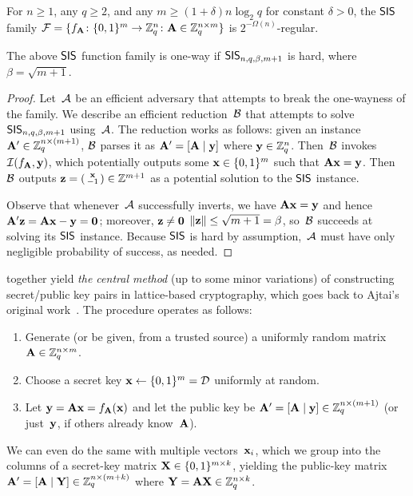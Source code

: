 \documentclass[11pt]{article}
\newcommand{\calI}{\ensuremath{\mathcal{I}}}
\begin{document}
\begin{lemma}%
  \label{lem:sis-regular}
  For $n \geq 1$, any $q \geq 2$, and any
  $m \geq (1+\delta) n \log_{2} q$ for constant $\delta > 0$, the
  $\mathsf{SIS}$ family
  $\mathcal{F}=\{f_{\mathbf{A}} \colon \{0,1\}^{m} \to \mathbb{Z}_q^{n} \colon \mathbf{A} \in
    \mathbb{Z}_q^{n \times m}\}$ is $2^{-\Omega(n)}$-regular.
\end{lemma}

\begin{lemma}%
  \label{lem:sis-oneway}
  The above $\mathsf{SIS}$ function family is one-way if
  $\mathsf{SIS}_{n,q,\beta,m+1}$ is hard, where $\beta=\sqrt{m+1}$.
\end{lemma}

\begin{proof}
  Let~$\mathcal{A}$ be an efficient adversary that attempts to break the
  one-wayness of the family. We describe an efficient
  reduction~$\mathcal{B}$ that attempts to solve~$\mathsf{SIS}_{n,q,\beta,m+1}$
  using~$\mathcal{A}$. The reduction works as follows: given an instance
  $\mathbf{A}' \in \mathbb{Z}_q^{n \times (m+1)}$, $\mathcal{B}$ parses it as
  $\mathbf{A}'=[\mathbf{A} \mid \mathbf{y}]$ where $\mathbf{y} \in \mathbb{Z}_q^{n}$. Then~$\mathcal{B}$
  invokes $\calI(f_{\matA},\vecy)$, which potentially outputs some
  $\mathbf{x} \in \{0,1\}^{m}$ such that $\mathbf{A}\mathbf{x}=\mathbf{y}$. Then~$\mathcal{B}$
  outputs $\mathbf{z} = \left(\begin{smallmatrix}\mathbf{x} \\ -1\end{smallmatrix}\right) \in \mathbb{Z}^{m+1}$ as a potential
  solution to the $\mathsf{SIS}$ instance.

  Observe that whenever~$\mathcal{A}$ successfully inverts, we have
  $\mathbf{A}\mathbf{x}=\mathbf{y}$ and hence
  $\mathbf{A}' \mathbf{z} = \mathbf{A} \mathbf{x} - \mathbf{y} = \mathbf{0}$; moreover,
  $\mathbf{z} \neq \mathbf{0}$ $\lVert\mathbf{z}\rVert \leq \sqrt{m+1}=\beta$,
  so~$\mathcal{B}$ succeeds at solving its $\mathsf{SIS}$ instance. Because $\mathsf{SIS}$
  is hard by assumption,~$\mathcal{A}$ must have only negligible probability
  of success, as needed.
\end{proof}

 together yield \emph{the central
  method} (up to some minor variations) of constructing secret/public
key pairs in lattice-based cryptography, which goes back to Ajtai's
original work~\cite{ajtai04:_gener_hard_instan_lattic_probl}. The
procedure operates as follows:
\begin{enumerate}[itemsep=0pt]
\item Generate (or be given, from a trusted source) a uniformly random
  matrix $\mathbf{A} \in \mathbb{Z}_q^{n \times m}$.
\item Choose a secret key $\mathbf{x} \gets \{0,1\}^{m} = \mathcal{D}$ uniformly at
  random.
\item Let $\mathbf{y} = \mathbf{A}\mathbf{x} = f_{\mathbf{A}}(\mathbf{x})$ and let the public
  key be $\mathbf{A}' = [\mathbf{A} \mid \mathbf{y}] \in \mathbb{Z}_q^{n \times (m+1)}$ (or
  just~$\mathbf{y}$, if others already know~$\mathbf{A}$).
\end{enumerate}
We can even do the same with multiple vectors~$\mathbf{x}_{i}$, which we
group into the columns of a secret-key matrix
$\mathbf{X} \in \{0,1\}^{m \times k}$, yielding the public-key matrix
$\mathbf{A}' = [\mathbf{A} \mid \mathbf{Y}] \in \mathbb{Z}_q^{n \times (m+k)}$ where
$\mathbf{Y} = \mathbf{A} \mathbf{X} \in \mathbb{Z}_q^{n \times k}$.
\end{document}
